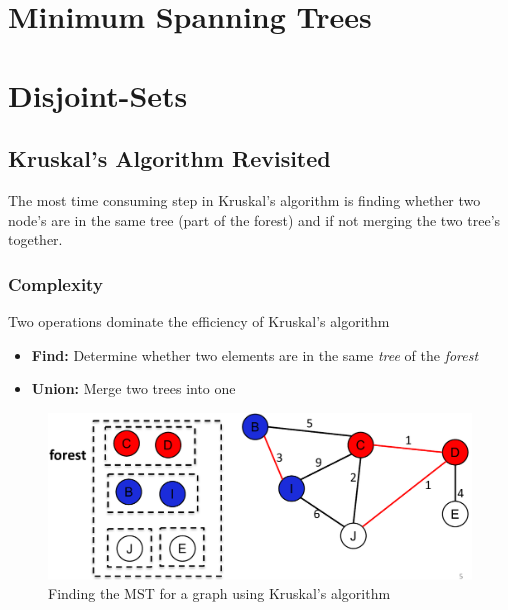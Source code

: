 \documentclass[
]{book}
\providecommand{\tightlist}{%
  \setlength{\itemsep}{0pt}\setlength{\parskip}{0pt}}
\begin{document}
\hypertarget{mst}{%
\chapter{Minimum Spanning Trees}\label{mst}}

\hypertarget{djs}{%
\chapter{Disjoint-Sets}\label{djs}}

\hypertarget{kruskals-algorithm-revisited}{%
\section{Kruskal's Algorithm Revisited}\label{kruskals-algorithm-revisited}}

The most time consuming step in Kruskal's algorithm is finding whether two node's are in the same tree (part of the forest) and if not
merging the two tree's together.

\hypertarget{complexity}{%
\subsection{Complexity}\label{complexity}}

Two operations dominate the efficiency of Kruskal's algorithm

\begin{itemize}
\tightlist
\item
  \textbf{{Find}:} Determine whether two elements are in the same \emph{tree} of the \emph{forest}
\item
  \textbf{{Union}:} Merge two trees into one
\end{itemize}

\begin{figure}

{\centering \includegraphics{img/07-image00} 

}

\caption{Finding the MST for a graph using Kruskal's algorithm}\label{fig:kruskal}
\end{figure}
\end{document}
